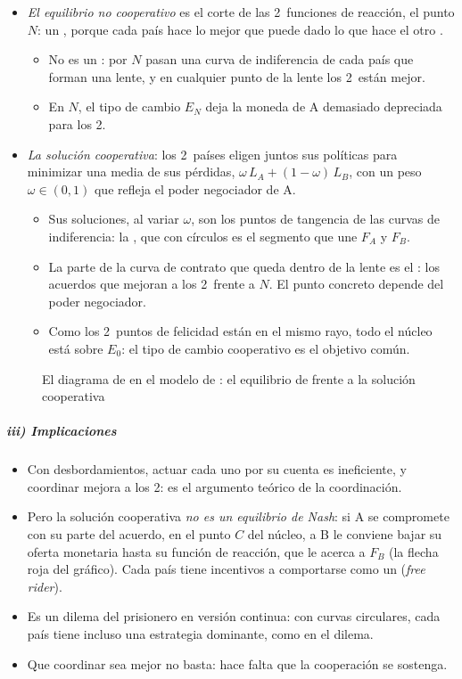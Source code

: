 \documentclass[11pt]{article}
\begin{document}
\begin{itemize}
\item \emph{El equilibrio no cooperativo} es el corte de las 2~funciones de reacción, el punto $N$: un , porque cada país hace lo mejor que puede dado lo que hace el otro .
  \begin{itemize}
  \item No es un : por $N$ pasan una curva de indiferencia de cada país que forman una lente, y en cualquier punto de la lente los 2~están mejor.
  \item En $N$, el tipo de cambio $E_N$ deja la moneda de A demasiado depreciada para los 2.
  \end{itemize}
\item \emph{La solución cooperativa}: los 2~países eligen juntos sus políticas para minimizar una media de sus pérdidas, $\omega\,L_A+(1-\omega)\,L_B$, con un peso $\omega\in(0,1)$ que refleja el poder negociador de A.
  \begin{itemize}
  \item Sus soluciones, al variar $\omega$, son los puntos de tangencia de las curvas de indiferencia: la , que con círculos es el segmento que une $F_A$ y $F_B$.
  \item La parte de la curva de contrato que queda dentro de la lente es el : los acuerdos que mejoran a los 2~frente a $N$. El punto concreto depende del poder negociador.
  \item Como los 2~puntos de felicidad están en el mismo rayo, todo el núcleo está sobre $E_0$: el tipo de cambio cooperativo es el objetivo común.
  \end{itemize}
\end{itemize}

\begin{figure}[H]
\centering
\caption{El diagrama de  en el modelo de : el equilibrio de  frente a la solución cooperativa}\label{fig:hamada}
\end{figure}

\subparagraph{iii) Implicaciones}
\begin{itemize}
\item Con desbordamientos, actuar cada uno por su cuenta es ineficiente, y coordinar mejora a los 2: es el argumento teórico de la coordinación.
\item Pero la solución cooperativa \emph{no es un equilibrio de Nash}: si A se compromete con su parte del acuerdo, en el punto $C$ del núcleo, a B le conviene bajar su oferta monetaria hasta su función de reacción, que le acerca a $F_B$ (la flecha roja del gráfico). Cada país tiene incentivos a comportarse como un  (\emph{free rider}).
\item Es un dilema del prisionero en versión continua: con curvas circulares, cada país tiene incluso una estrategia dominante, como en el dilema.
\item Que coordinar sea mejor no basta: hace falta que la cooperación se sostenga.
\end{itemize}
\end{document}
